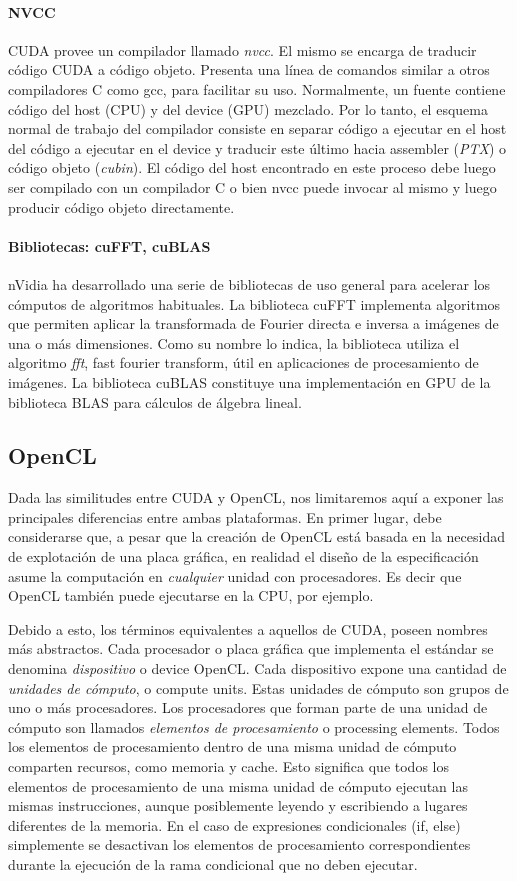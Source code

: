 \paragraph{NVCC}
CUDA provee un compilador llamado {\em nvcc}.
El mismo se encarga de traducir c\'odigo CUDA a c\'odigo objeto.
Presenta una l\'inea de comandos similar a otros compiladores C como gcc, para facilitar su uso.
Normalmente, un fuente contiene c\'odigo del host (CPU) y del device (GPU) mezclado.
Por lo tanto, el esquema normal de trabajo del compilador consiste en separar c\'odigo a ejecutar en el host del c\'odigo a ejecutar en el device y traducir este \'ultimo hacia assembler ({\em PTX}) o c\'odigo objeto ({\em cubin}).
El c\'odigo del host encontrado en este proceso debe luego ser compilado con un compilador C o bien nvcc puede invocar al mismo y luego producir c\'odigo objeto directamente.

\paragraph{Bibliotecas: cuFFT, cuBLAS}
nVidia ha desarrollado una serie de bibliotecas de uso general para acelerar los cómputos de algoritmos habituales.
La biblioteca cuFFT implementa algoritmos que permiten aplicar la transformada de Fourier directa e inversa a im\'agenes de una o m\'as dimensiones.
Como su nombre lo indica, la biblioteca utiliza el algoritmo {\em fft}, fast fourier transform, útil en aplicaciones de procesamiento de imágenes.
La biblioteca cuBLAS constituye una implementación en GPU de la biblioteca BLAS para cálculos de álgebra lineal.


\subsection{OpenCL}
Dada las similitudes entre CUDA y OpenCL, nos limitaremos aquí a exponer las principales diferencias entre ambas plataformas.
En primer lugar, debe considerarse que, a pesar que la creación de OpenCL está basada en la necesidad de explotación de una placa gráfica, en realidad el diseño de la especificación asume la computación en {\em cualquier} unidad con procesadores.
Es decir que OpenCL también puede ejecutarse en la CPU, por ejemplo.

Debido a esto, los términos equivalentes a aquellos de CUDA, poseen nombres más abstractos.
Cada procesador o placa gráfica que implementa el estándar se denomina {\em dispositivo} o device OpenCL. Cada dispositivo expone una cantidad de {\em unidades de cómputo}, o compute units. Estas unidades de cómputo son grupos de uno o más procesadores.
Los procesadores que forman parte de una unidad de cómputo son llamados {\em elementos
de procesamiento} o processing elements.
Todos los elementos de procesamiento dentro de una misma unidad de cómputo comparten recursos, como memoria y cache.
Esto significa que todos los elementos de procesamiento de una misma unidad de cómputo ejecutan las mismas instrucciones, aunque posiblemente leyendo y escribiendo a lugares diferentes de la memoria. En el caso de expresiones condicionales (if, else) simplemente se desactivan los elementos de procesamiento correspondientes durante la ejecución de la rama condicional que no deben ejecutar.

